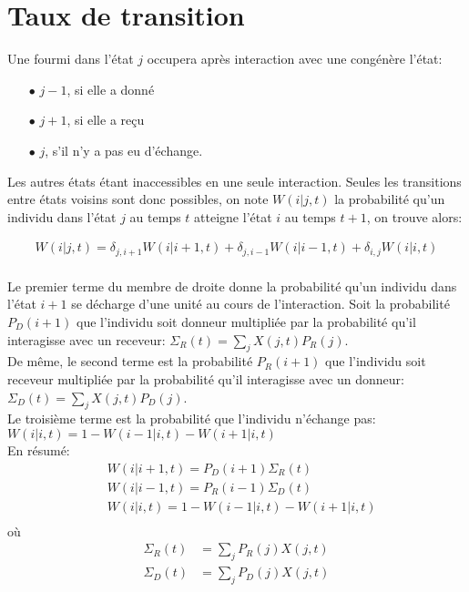 \section{Taux de transition}
Une fourmi dans l'état $j$ occupera après interaction avec une congénère l'état:
\begin{itemize}
\item[$\bullet$] $j-1$, si elle a donné
\item[$\bullet$] $j+1$, si elle a reçu
\item[$\bullet$] $j$, s'il n'y a pas eu d'échange.
\end{itemize}
Les autres états étant inaccessibles en une seule interaction. Seules les transitions entre états voisins sont donc possibles, on note $W(i|j,t)$ la probabilité qu'un individu dans l'état $j$ au temps $t$ atteigne l'état $i$ au temps $t+1$, on trouve alors:


\begin{equation}
\begin{aligned}
W(i|j,t) = \delta_{j,i+1} W(i|i+1,t) + \delta_{j,i-1} W(i|i-1,t) + \delta_{i,j} W(i|i,t)\\
\label{Wij}
\end{aligned}
\end{equation}


Le premier terme du membre de droite donne la probabilité qu'un individu dans l'état $i+1$ se décharge d'une unité au cours de l'interaction. Soit la probabilité $P_D(i+1)$ que l'individu soit donneur multipliée par la probabilité qu'il interagisse avec un receveur: $\Sigma_R(t) = \sum_j X(j,t) P_R(j)$.\\
De même, le second terme est la probabilité $P_R(i+1)$ que l'individu soit receveur multipliée par la probabilité qu'il interagisse avec un donneur: $\Sigma_D(t) = \sum_j X(j,t) P_D(j)$.\\
Le troisième terme est la probabilité que l'individu n'échange pas: $W(i|i,t) = 1 - W(i-1|i,t)- W(i+1|i,t)$\\


En résumé:
\begin{equation}
\begin{aligned}
&W(i|i+1,t)= P_D(i+1) \Sigma_R(t)\\
&W(i|i-1,t)= P_R(i-1) \Sigma_D(t)\\
&W(i|i,t) = 1- W(i-1|i,t)- W(i+1|i,t)\\
\label{TransitionVoisins}
\end{aligned}
\end{equation}
où
\begin{equation}
\begin{aligned}
\Sigma_R	(t)	&= \sum_j P_R(j) X(j,t)\\
\Sigma_D(t) 	&= \sum_j P_D(j) X(j,t)\\
\label{SigmaRD}
\end{aligned}
\end{equation}



